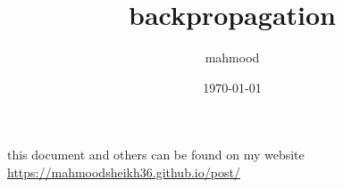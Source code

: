 \documentclass[a4paper,12pt]{article}
\author{mahmood}
\date{\today}
\title{backpropagation}
\begin{document}
\maketitle
\begin{note}
this document and others can be found on my website\\
\url{https://mahmoodsheikh36.github.io/post/}
\end{note}
\end{document}
